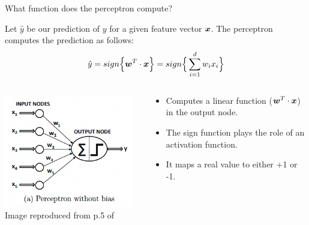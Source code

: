 \begin{frame}[t]{What function does the perceptron compute?}

    Let $\hat{y}$ be our prediction of $y$ for a given feature vector $\boldsymbol{x}$.
    The \gls{perceptron} computes the prediction as follows:
    \begin{equation}
        \hat{y} = sign\Big\{ \boldsymbol{w}^T \cdot \boldsymbol{x} \Big\} = sign\Big\{ \sum_{i=1}^{d} w_i x_i \Big\}
        \label{eq:perceptron_prediction_wo_bias}
    \end{equation}        

    \vspace{-1.0cm}

    \begin{columns}
        \begin{column}{0.50\textwidth}
         \begin{center}
          \includegraphics[width=0.95\textwidth]{./images/perceptron/perceptron_without_bias.png}\\
          {\scriptsize \color{col:attribution} 
          Image reproduced from p.5 of \cite{Aggarwal:2018SpringerDL}}\\
         \end{center}
        \end{column}
        \begin{column}{0.50\textwidth}
            \begin{itemize}
                \small
                \item Computes a linear function 
                ($\boldsymbol{w}^T \cdot \boldsymbol{x}$) in the output node.
                \item The sign function plays the role of
                an \gls{activation function}.
                \item It maps a real value to either +1 or -1.
            \end{itemize}        
        \end{column}
    \end{columns}
      
\end{frame}


